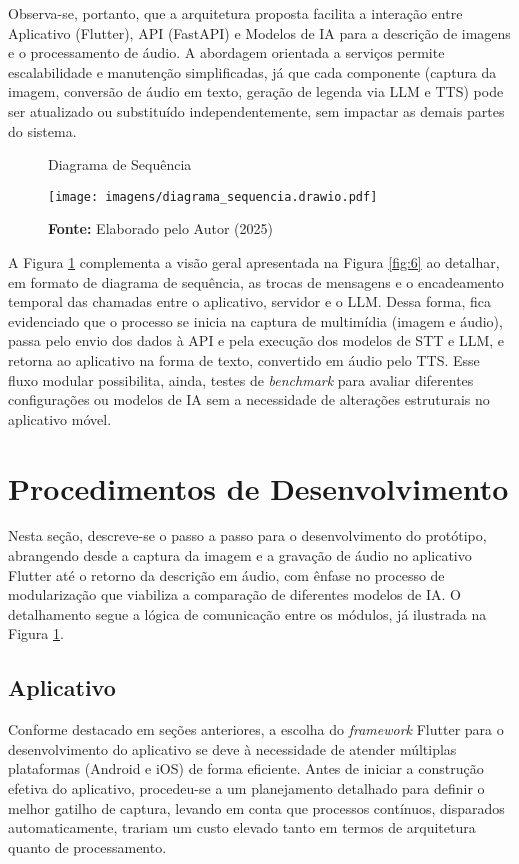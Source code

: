 Observa-se, portanto, que a arquitetura proposta facilita a interação entre Aplicativo (Flutter), API (FastAPI) e Modelos de IA para a descrição de imagens e o processamento de áudio. A abordagem orientada a serviços permite escalabilidade e manutenção simplificadas, já que cada componente (captura da imagem, conversão de áudio em texto, geração de legenda via LLM e TTS) pode ser atualizado ou substituído independentemente, sem impactar as demais partes do sistema.

\begin{figure}[!h]
     \caption{Diagrama de Sequência}
     \centering
     \texttt{[image: imagens/diagrama\_sequencia.drawio.pdf]}
     \label{fig:7}
     \caption*{\textbf{Fonte:} Elaborado pelo Autor (2025)}
\end{figure}

A Figura \ref{fig:7} complementa a visão geral apresentada na Figura \ref{fig:6} ao detalhar, em formato de diagrama de sequência, as trocas de mensagens e o encadeamento temporal das chamadas entre o aplicativo, servidor e o LLM. Dessa forma, fica evidenciado que o processo se inicia na captura de multimídia (imagem e áudio), passa pelo envio dos dados à API e pela execução dos modelos de STT e LLM, e retorna ao aplicativo na forma de texto, convertido em áudio pelo TTS. Esse fluxo modular possibilita, ainda, testes de \textit{benchmark} para avaliar diferentes configurações ou modelos de IA sem a necessidade de alterações estruturais no aplicativo móvel.

\section{Procedimentos de Desenvolvimento}

Nesta seção, descreve-se o passo a passo para o desenvolvimento do protótipo, abrangendo desde a captura da imagem e a gravação de áudio no aplicativo Flutter até o retorno da descrição em áudio, com ênfase no processo de modularização que viabiliza a comparação de diferentes modelos de IA. O detalhamento segue a lógica de comunicação entre os módulos, já ilustrada na Figura \ref{fig:7}.

\subsection{Aplicativo}

Conforme destacado em seções anteriores, a escolha do \textit{framework} Flutter para o desenvolvimento do aplicativo se deve à necessidade de atender múltiplas plataformas (Android e iOS) de forma eficiente. Antes de iniciar a construção efetiva do aplicativo, procedeu-se a um planejamento detalhado para definir o melhor gatilho de captura, levando em conta que processos contínuos, disparados automaticamente, trariam um custo elevado tanto em termos de arquitetura quanto de processamento.

